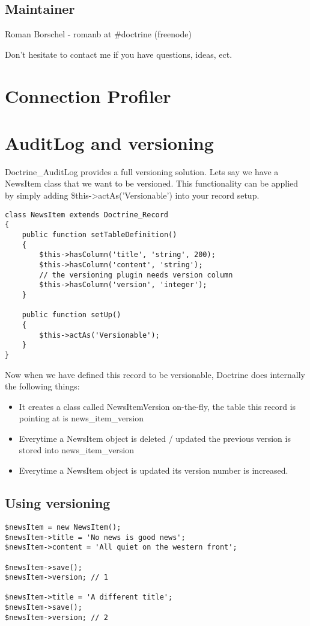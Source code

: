 \documentclass[11pt,a4paper]{report}
\begin{document}
\subsection{Maintainer}
Roman Borschel - romanb at \#doctrine (freenode)

Don't hesitate to contact me if you have questions, ideas, ect.

\section{Connection Profiler}
\section{AuditLog and versioning}
Doctrine\_AuditLog provides a full versioning solution. Lets say we have a NewsItem class that we want to be versioned. This functionality can be applied by simply adding \$this->actAs('Versionable') into your record setup.

\begin{verbatim}
class NewsItem extends Doctrine_Record
{
    public function setTableDefinition()
    {
        $this->hasColumn('title', 'string', 200);
        $this->hasColumn('content', 'string');
        // the versioning plugin needs version column
        $this->hasColumn('version', 'integer');
    }

    public function setUp()
    {
        $this->actAs('Versionable');
    }
}
\end{verbatim}

Now when we have defined this record to be versionable, Doctrine does internally the following things:

\begin{itemize}
\item{It creates a class called NewsItemVersion on-the-fly, the table this record is pointing at is news\_item\_version}
\item{Everytime a NewsItem object is deleted / updated the previous version is stored into news\_item\_version}
\item{Everytime a NewsItem object is updated its version number is increased.}
\end{itemize}
\subsection{Using versioning}
\begin{verbatim}
$newsItem = new NewsItem();
$newsItem->title = 'No news is good news';
$newsItem->content = 'All quiet on the western front';

$newsItem->save();
$newsItem->version; // 1

$newsItem->title = 'A different title';
$newsItem->save();
$newsItem->version; // 2
\end{verbatim}
\end{document}
